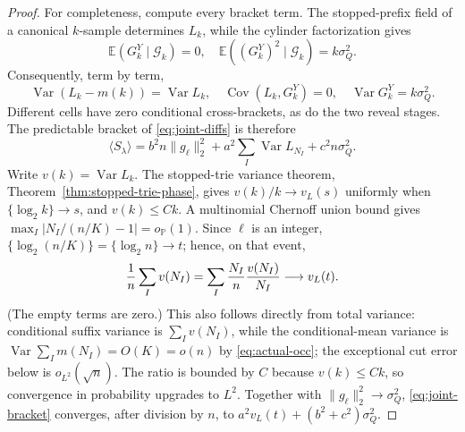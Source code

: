\documentclass[11pt]{article}
\numberwithin{equation}{section}
\newcommand{\1}{\mathbf 1}\newcommand{\F}{\mathcal F}\newcommand{\D}{\mathcal D}
\begin{document}
\begin{proof}
For completeness, compute every bracket term.  The stopped-prefix field of
a canonical $k$-sample determines $L_k$, while the cylinder factorization
gives
\[
 \mathbb E(G_k^Y\mid\mathcal G_k)=0,\quad
 \mathbb E((G_k^Y)^2\mid\mathcal G_k)=k\sigma_Q^2.
\]
Consequently, term by term,
\[
 \operatorname {Var}(L_k-m(k))=\operatorname {Var}L_k,\quad
 \operatorname {Cov}(L_k,G_k^Y)=0,\quad
 \operatorname {Var}G_k^Y=k\sigma_Q^2.
\]
Different cells have zero conditional cross-brackets, as do the two reveal
stages.  The predictable bracket of \eqref{eq:joint-diffs} is therefore
\begin{equation}
 \langle S_\lambda\rangle
 =b^2n\|g_\ell\|_2^2+a^2\sum_I\operatorname {Var}L_{N_I}
       +c^2n\sigma_Q^2.                              \label{eq:joint-bracket}
\end{equation}
Write $v(k)=\operatorname {Var}L_k$.  The stopped-trie variance theorem, Theorem~\ref{thm:stopped-trie-phase}, gives $v(k)/k\to v_L(s)$ uniformly when
$\{\log _2k\}\to s$, and $v(k)\le Ck$.  A multinomial Chernoff union
bound gives $\max_I|N_I/(n/K)-1|=o_{\mathbb P}(1)$.  Since $\ell$ is an
integer, $\{\log _2(n/K)\}=\{\log _2n\}\to t$; hence, on that event,
\[
 {1\over n}\sum_Iv(N_I)
 =\sum_I{N_I\over n}{v(N_I)\over N_I}
 \longrightarrow v_L(t).
\]
(The empty terms are zero.)  This also follows directly from total variance:
conditional suffix variance is $\sum_Iv(N_I)$, while the conditional-mean
variance is $\operatorname {Var}\sum_Im(N_I)=O(K)=o(n)$ by
\eqref{eq:actual-occ}; the exceptional cut error below is $o_{L^2}(\sqrt n)$.
The ratio is bounded by $C$ because $v(k)\le Ck$, so convergence in
probability upgrades to $L^2$.
Together with $\|g_\ell\|_2^2\to\sigma_Q^2$, \eqref{eq:joint-bracket}
converges, after division by $n$, to
$a^2v_L(t)+(b^2+c^2)\sigma_Q^2$.


\end{proof}
\end{document}
